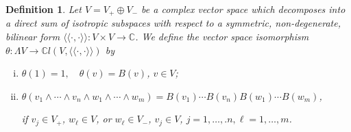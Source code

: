\documentclass{article}
\newcommand{\cdummy}{\cdot}
\newcommand{\llangle}{{\langle\!\langle}}
\newcommand{\rrangle}{{\rangle\!\rangle}}
\newenvironment{enumerateroman}{\begin{enumerate}[i.] }{\end{enumerate}}
\newtheorem{definition}[theorem]{Definition}
\begin{document}
\begin{definition}
  \label{GPdef:theta-map}Let $V = V_+ \oplus V_-$ be a complex vector space
  which decomposes into a direct sum of isotropic subspaces with respect to a
  symmetric, non-degenerate, bilinear form $\llangle \cdummy, \cdummy \rrangle
  : V \times V \rightarrow \mathbb{C}$. We define the vector space isomorphism
  $\theta : \Lambda V \rightarrow \mathbb{C}l (V, \llangle \cdummy, \cdummy
  \rrangle)$ by
  \begin{enumerateroman}
    \item $\theta (1) = 1, \quad \theta (v) = B (v)$, $v \in V$;
    
    \item $\theta (v_1 \wedge \cdots \wedge v_n \wedge w_1 \wedge \cdots
    \wedge w_m) = B (v_1) \cdots B (v_n) B (w_1) \cdots B (w_m)$,
    
    if $v_j \in V_+$, $w_{\ell} \in V$, or $w_{\ell} \in V_-$, $v_j \in V$,
    $j = 1, \ldots, .n, \ell = 1, \ldots, m$.
  \end{enumerateroman}
\end{definition}
\end{document}
